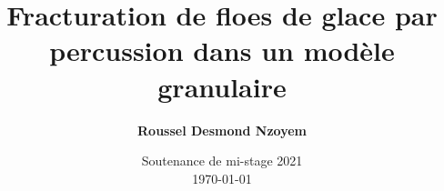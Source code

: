 \documentclass[notes,handout]{beamer}
\begin{document}

\title[\textsc{Fracturation de floes de glace}]{\LARGE Fracturation de floes de glace par percussion dans un modèle granulaire}

\author[Roussel Desmond Nzoyem]{\large \bfseries Roussel Desmond Nzoyem}



\date[Soutenance mi-stage 2021]{Soutenance de mi-stage 2021\\\today}


\begingroup



  \begin{frame}[fragile]
    \vspace*{0.5cm}
    \maketitle
  \end{frame}
\endgroup


\end{document}
